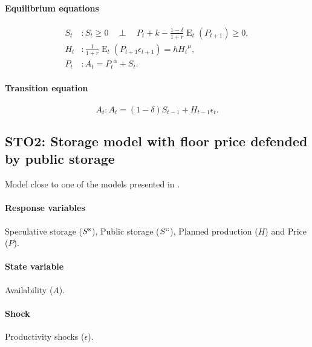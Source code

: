 \documentclass[11pt,fleqn]{article}
\DeclareMathOperator{\E}{E}
\newcommand{\Ss}{S^{\textsc{s}}}
\newcommand{\Sg}{S^{\textsc{g}}}
\newcommand{\CP}{\quad \perp \quad}
\begin{document}
\paragraph{Equilibrium equations}
\label{sec:equil-equat}

\begin{align}
  S_{t}&: S_{t}\ge 0 \CP P_{t}+k-\frac{1-\delta}{1+r}\E_{t}\left(P_{t+1}\right)\ge 0,\\
  H_{t}&: \frac{1}{1+r}\E_{t}\left(P_{t+1}\epsilon_{t+1}\right)=h {H_{t}}^{\mu},\\
  P_{t}&: A_{t}={P_{t}}^{\alpha}+S_{t}.
\end{align}

\paragraph{Transition equation}
\label{sec:transition-equation}

\begin{equation}
  A_{t}: A_{t}=\left(1-\delta\right)S_{t-1}+H_{t-1}\epsilon_{t}.
\end{equation}

\subsection{STO2: Storage model with floor price defended by public storage}
\label{sec:storage-model-with}

Model close to one of the models presented in \citet{Wrig88a}.

\paragraph{Response variables}
\label{sec:response-variables}

Speculative storage ($\Ss$), Public storage ($\Sg$), Planned production ($H$) and
Price ($P$).

\paragraph{State variable}
\label{sec:state-variable}

Availability ($A$).

\paragraph{Shock}
\label{sec:shock}

Productivity shocks ($\epsilon$).
\end{document}
